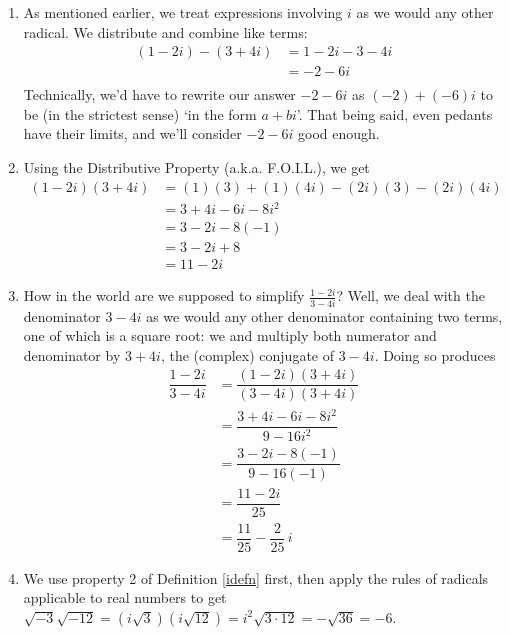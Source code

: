 {
\begin{enumerate}

\item  As mentioned earlier, we treat expressions involving $i$ as we would any other radical. We distribute and combine like terms:
\begin{align*}
 (1-2i) - (3+4i) & =   1-2i-3-4i  \tag*{Distribute} \\
                 & =   -2 - 6i  \tag*{Gather like terms} \\
\end{align*}
Technically, we'd have to rewrite our answer  $-2-6i$ as $(-2) + (-6)i$ to be (in the strictest sense) `in the form $a+bi$'. That being said, even pedants have their limits, and we'll consider $-2-6i$ good enough.

\item  Using the Distributive Property (a.k.a. F.O.I.L.), we get
\begin{align*}
  (1-2i)(3+4i)  & =  (1)(3) + (1)(4i) - (2i)(3) - (2i)(4i)  \tag*{F.O.I.L.} \\
	              & =  3+4i-6i-8i^2  \\
								& =  3 - 2i - 8(-1)  \tag*{$i^2=-1$} \\
								& =  3 - 2i + 8  \\
								& =  11 - 2i 
\end{align*}

\item  How in the world are we supposed to simplify $\frac{1-2i}{3-4i}$?  Well, we deal with the denominator $3-4i$ as we would any other denominator containing two terms, one of which is a square root: we and multiply both numerator and denominator by $3+4i$, the (complex) conjugate of $3 - 4i$.  Doing so produces
\begin{align*}
 \dfrac{1-2i}{3-4i} & =  \dfrac{(1-2i)(3+4i)}{(3-4i)(3+4i)}  \tag*{Equivalent Fractions} \\[5pt]
                    & =    \dfrac{3 + 4i - 6i - 8i^2}{9 - 16i^2}  \tag*{F.O.I.L.}\\[5pt]
					& =  \dfrac{3 - 2i - 8(-1)}{9  - 16(-1)}  \tag*{$i^2 = -1$}\\[5pt]
					& =  \dfrac{11 - 2i}{25} \\[5pt]
					& =  \dfrac{11}{25} - \dfrac{2}{25} \, i 
\end{align*}
										

\item  We use property 2 of Definition \ref{idefn} first, then apply the rules of radicals applicable to real numbers to get $\sqrt{-3} \sqrt{-12} = \left(i \sqrt{3}\right) \left(i \sqrt{12}\right) = i^2 \sqrt{3\cdot 12} = -\sqrt{36} = -6$.


\end{enumerate}}
